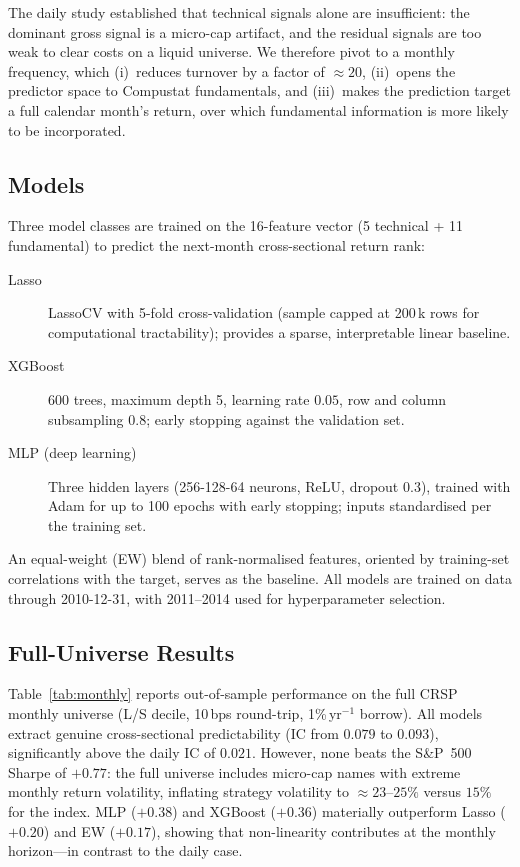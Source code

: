 \documentclass[11pt,a4paper]{article}
\begin{document}
The daily study established that technical signals alone are insufficient: the
dominant gross signal is a micro-cap artifact, and the residual signals are too
weak to clear costs on a liquid universe. We therefore pivot to a monthly
frequency, which (i)~reduces turnover by a factor of $\approx 20$,
(ii)~opens the predictor space to Compustat fundamentals, and
(iii)~makes the prediction target a full calendar month's return, over which
fundamental information is more likely to be incorporated.

\subsection{Models}
\label{sec:monthly-models}

Three model classes are trained on the 16-feature vector (5 technical + 11
fundamental) to predict the next-month cross-sectional return rank:

\begin{description}
  \item[Lasso] LassoCV with 5-fold cross-validation (sample capped at 200\,k
  rows for computational tractability); provides a sparse, interpretable linear
  baseline.
  \item[XGBoost] 600 trees, maximum depth 5, learning rate $0.05$, row and column
  subsampling $0.8$; early stopping against the validation set.
  \item[MLP (deep learning)] Three hidden layers (256-128-64 neurons, ReLU,
  dropout $0.3$), trained with Adam for up to 100 epochs with early stopping;
  inputs standardised per the training set.
\end{description}

An equal-weight (EW) blend of rank-normalised features, oriented by
training-set correlations with the target, serves as the baseline. All models
are trained on data through 2010-12-31, with 2011--2014 used for
hyperparameter selection.

\subsection{Full-Universe Results}
\label{sec:monthly-full}

Table~\ref{tab:monthly} reports out-of-sample performance on the full CRSP
monthly universe (L/S decile, 10\,bps round-trip, 1\%\,yr$^{-1}$ borrow). All
models extract genuine cross-sectional predictability (IC from $0.079$ to $0.093$),
significantly above the daily IC of $0.021$. However, none beats the S\&P~500
Sharpe of $+0.77$: the full universe includes micro-cap names with extreme
monthly return volatility, inflating strategy volatility to $\approx 23$--$25\%$
versus $15\%$ for the index. MLP ($+0.38$) and XGBoost ($+0.36$) materially
outperform Lasso ($+0.20$) and EW ($+0.17$), showing that non-linearity
contributes at the monthly horizon---in contrast to the daily case.
\end{document}

